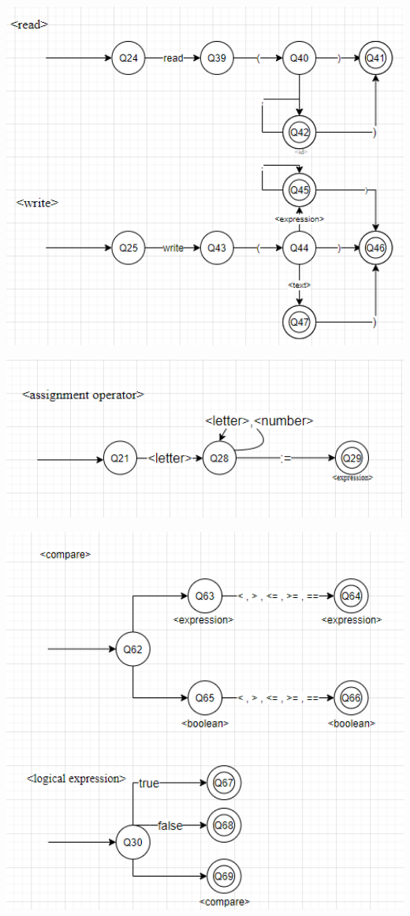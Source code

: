 \documentclass[12pt]{article}
\begin{document}
\includegraphics[width=1\textwidth]{assets/Оператор Записи и Чтения.png}

\includegraphics[width=1\textwidth]{assets/Оператор Присваивания.png}

\includegraphics[width=1\textwidth]{assets/Сравнение и Логика.png}
\end{document}

